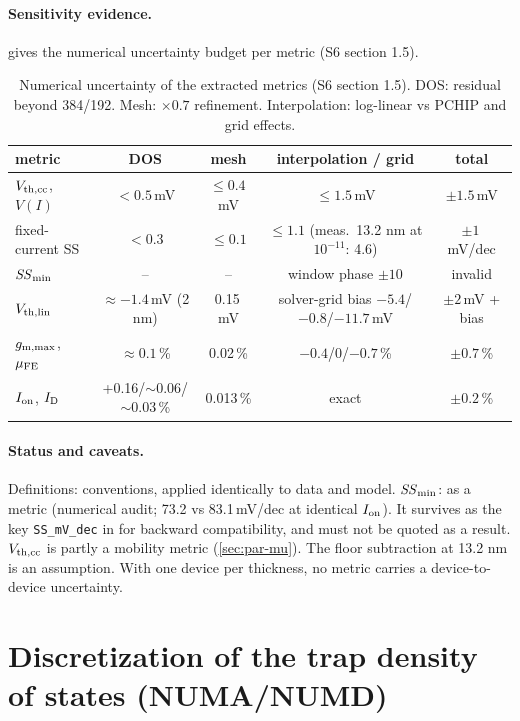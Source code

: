 \paragraph{Sensitivity evidence.}
 gives the numerical uncertainty budget per metric (S6 section 1.5).
\begin{table}[htbp]
\centering
\small
\caption{Numerical uncertainty of the extracted metrics (S6 section 1.5). DOS: residual beyond 384/192. Mesh: $\times0.7$ refinement. Interpolation: log-linear vs PCHIP and grid effects.}
\label{tab:d2-uncertainty}
\begin{tabular}{@{}lcccc@{}}
\toprule
metric & DOS & mesh & interpolation / grid & total \\
\midrule
$V_{\mathrm{th,cc}}$, $V(I)$ & $<0.5$\,mV & $\le0.4$\,mV & $\le1.5$\,mV & $\pm1.5$\,mV \\
fixed-current SS & $<0.3$ & $\le0.1$ & $\le1.1$ (meas.\ 13.2 nm at $10^{-11}$: 4.6) & $\pm1$\,mV/dec \\
$\mathit{SS}_{\min}$ & -- & -- & window phase $\pm10$ & invalid \\
$V_{\mathrm{th,lin}}$ & ${\approx}-1.4$\,mV (2 nm) & 0.15\,mV & solver-grid bias $-5.4$/$-0.8$/$-11.7$\,mV & $\pm2$\,mV + bias \\
$g_{\mathrm{m,max}}$, $\mu_{\mathrm{FE}}$ & ${\approx}0.1$\,\% & 0.02\,\% & $-0.4$/0/$-0.7$\,\% & $\pm0.7$\,\% \\
$I_{\mathrm{on}}$, $I_{\mathrm{D}}$ & +0.16/${\sim}$0.06/${\sim}$0.03\,\% & 0.013\,\% & exact & $\pm0.2$\,\% \\
\bottomrule
\end{tabular}
\end{table}

\paragraph{Status and caveats.}
Definitions: conventions, applied identically to data and model. $\mathit{SS}_{\min}$:  as a metric (numerical audit; 73.2 vs 83.1\,mV/dec at identical $I_{\mathrm{on}}$). It survives as the key \texttt{SS\_mV\_dec} in  for backward compatibility, and must not be quoted as a result. $V_{\mathrm{th,cc}}$ is partly a mobility metric (\cref{sec:par-mu}). The floor subtraction at 13.2 nm is an assumption. With one device per thickness, no metric carries a device-to-device uncertainty.

\section{Discretization of the trap density of states (NUMA/NUMD)}\label{sec:der-dos-discretization}

